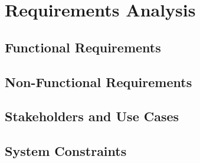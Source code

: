   \section{Requirements Analysis}
  \label{subsec:requirements}

  \subsection{Functional Requirements}
  \label{subsec:functional-requirements}

  \subsection{Non-Functional Requirements}
  \label{subsec:non-functional-requirements}

  \subsection{Stakeholders and Use Cases}
  \label{subsec:stakeholders}

  \subsection{System Constraints}
  \label{subsec:system-constraints}